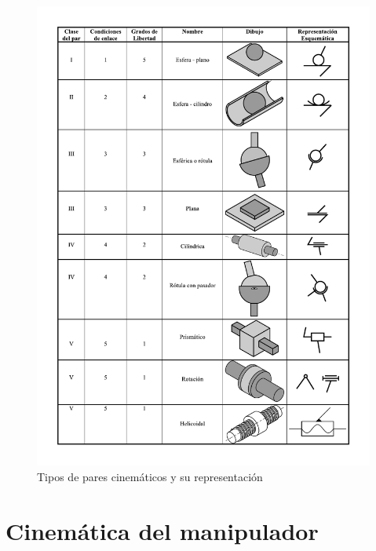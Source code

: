 \begin{figure}[!h]
	\centering
	\includegraphics[scale=0.8]{Capitulo2/figs/Pares.pdf}      %
	\caption{Tipos de pares cinemáticos y su representación}            %
	\label{figPares}                            %
\end{figure}

\section{Cinemática del manipulador}
